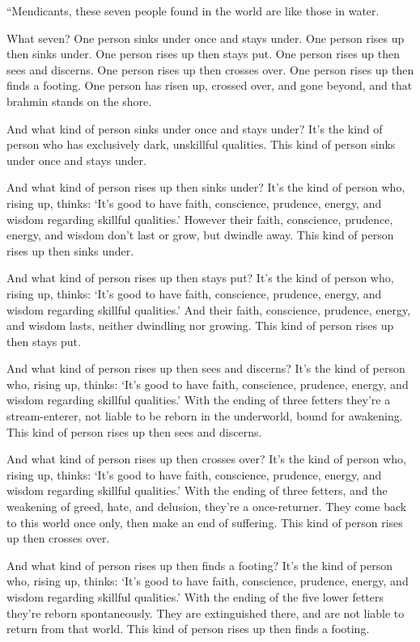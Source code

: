 \documentclass[12pt,openany]{book}%
\begin{document}
“Mendicants, these seven people found in the world are like those in water. 

What seven? One person sinks under once and stays under. One person rises up then sinks under. One person rises up then stays put. One person rises up then sees and discerns. One person rises up then crosses over. One person rises up then finds a footing. One person has risen up, crossed over, and gone beyond, and that brahmin stands on the shore. 

And what kind of person sinks under once and stays under? It’s the kind of person who has exclusively dark, unskillful qualities. This kind of person sinks under once and stays under. 

And what kind of person rises up then sinks under? It’s the kind of person who, rising up, thinks: ‘It’s good to have faith, conscience, prudence, energy, and wisdom regarding skillful qualities.’ However their faith, conscience, prudence, energy, and wisdom don’t last or grow, but dwindle away. This kind of person rises up then sinks under. 

And what kind of person rises up then stays put? It’s the kind of person who, rising up, thinks: ‘It’s good to have faith, conscience, prudence, energy, and wisdom regarding skillful qualities.’ And their faith, conscience, prudence, energy, and wisdom lasts, neither dwindling nor growing. This kind of person rises up then stays put. 

And what kind of person rises up then sees and discerns? It’s the kind of person who, rising up, thinks: ‘It’s good to have faith, conscience, prudence, energy, and wisdom regarding skillful qualities.’ With the ending of three fetters they’re a stream-enterer, not liable to be reborn in the underworld, bound for awakening. This kind of person rises up then sees and discerns. 

And what kind of person rises up then crosses over? It’s the kind of person who, rising up, thinks: ‘It’s good to have faith, conscience, prudence, energy, and wisdom regarding skillful qualities.’ With the ending of three fetters, and the weakening of greed, hate, and delusion, they’re a once-returner. They come back to this world once only, then make an end of suffering. This kind of person rises up then crosses over. 

And what kind of person rises up then finds a footing? It’s the kind of person who, rising up, thinks: ‘It’s good to have faith, conscience, prudence, energy, and wisdom regarding skillful qualities.’ With the ending of the five lower fetters they’re reborn spontaneously. They are extinguished there, and are not liable to return from that world. This kind of person rises up then finds a footing. 
\end{document}
